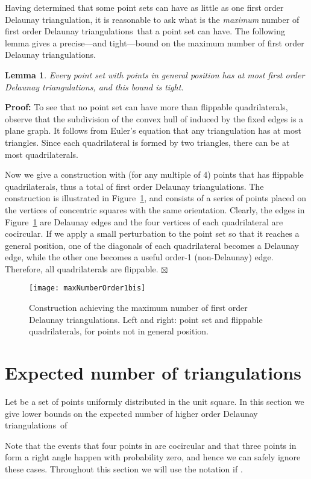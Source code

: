 \documentclass {journal}
\newtheorem {lemma} {Lemma}
\newenvironment {proof}{\textbf {Proof:}}{\hfill \ensuremath {\boxtimes}}
\newcommand {\hodts}{higher order Delaunay triangulations}
\newcommand {\fodt}{first order Delaunay triangulation}
\newcommand {\fodts}{first order Delaunay triangulations}
\begin{document}
Having determined that some point sets can have as little as one \fodt, it is reasonable to ask what is the \emph{maximum} number of \fodts\ that a point set can have.
The following lemma gives a precise---and tight---bound on the maximum number of \fodts.

\begin{lemma} \label{lem:maxfodt}
Every point set  with  points in general position has at most
 \fodts, and this bound is tight.
\end{lemma}
\begin{proof}
To see that no point set can have more than  flippable
quadrilaterals, observe that the subdivision of the convex hull of
 induced by the fixed edges is a plane graph. It follows
from Euler's equation that any triangulation has at most 
triangles. Since each quadrilateral is formed by two triangles,
there can be at most  quadrilaterals.

Now we give a construction with  (for  any multiple of 4)
points that has  flippable quadrilaterals, thus a total of
 \fodts. The construction is illustrated in
Figure~\ref{fig:maxNumberOrder1bis}, and consists of a series of
points placed on the vertices of concentric squares with the same
orientation. Clearly, the edges in
Figure~\ref{fig:maxNumberOrder1bis} are Delaunay edges and the
four vertices of each quadrilateral are cocircular. If we apply a
small perturbation to the point set so that it reaches a general
position, one of the diagonals of each quadrilateral becomes a
Delaunay edge, while the other one becomes a useful order-1
(non-Delaunay) edge. Therefore, all quadrilaterals are flippable.
\end{proof}

\begin{figure}[tb]
\centering
\texttt{[image: maxNumberOrder1bis]}
\caption{Construction achieving the maximum number of \fodts. Left
and right: point set and flippable quadrilaterals, for points not
in general position.} \label{fig:maxNumberOrder1bis}
\end{figure}



\section{Expected number of triangulations}
\label{sec:ExpNumTriang} Let  be a set of  points
uniformly distributed in the unit square. In this section we give
lower bounds on the expected number of \hodts\ of 

Note  that the events that four points in 
are cocircular and that three points in  form a right angle
happen with probability zero, and hence we can safely ignore these cases. Throughout this section we will use the notation  if .
\end{document}
